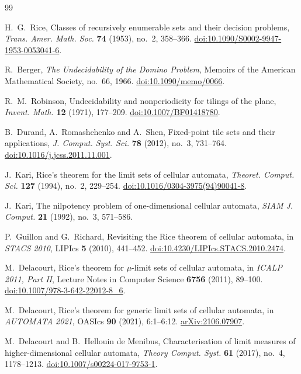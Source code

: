 \begin{thebibliography}{99}
\raggedright

H.~G.~Rice,
Classes of recursively enumerable sets and their decision problems,
\emph{Trans. Amer. Math. Soc.} \textbf{74} (1953), no.~2, 358--366.
\href{https://doi.org/10.1090/S0002-9947-1953-0053041-6}{doi:10.1090/S0002-9947-1953-0053041-6}.

R.~Berger,
\emph{The Undecidability of the Domino Problem},
Memoirs of the American Mathematical Society, no.~66, 1966.
\href{https://doi.org/10.1090/memo/0066}{doi:10.1090/memo/0066}.

R.~M.~Robinson,
Undecidability and nonperiodicity for tilings of the plane,
\emph{Invent. Math.} \textbf{12} (1971), 177--209.
\href{https://doi.org/10.1007/BF01418780}{doi:10.1007/BF01418780}.

B.~Durand, A.~Romashchenko and A.~Shen,
Fixed-point tile sets and their applications,
\emph{J. Comput. Syst. Sci.} \textbf{78} (2012), no.~3, 731--764.
\href{https://doi.org/10.1016/j.jcss.2011.11.001}{doi:10.1016/j.jcss.2011.11.001}.

J.~Kari,
Rice's theorem for the limit sets of cellular automata,
\emph{Theoret. Comput. Sci.} \textbf{127} (1994), no.~2, 229--254.
\href{https://doi.org/10.1016/0304-3975(94)90041-8}{doi:10.1016/0304-3975(94)90041-8}.

J.~Kari,
The nilpotency problem of one-dimensional cellular automata,
\emph{SIAM J. Comput.} \textbf{21} (1992), no.~3, 571--586.

P.~Guillon and G.~Richard,
Revisiting the Rice theorem of cellular automata,
in \emph{STACS 2010}, LIPIcs \textbf{5} (2010), 441--452.
\href{https://doi.org/10.4230/LIPIcs.STACS.2010.2474}{doi:10.4230/LIPIcs.STACS.2010.2474}.

M.~Delacourt,
Rice's theorem for $\mu$-limit sets of cellular automata,
in \emph{ICALP 2011, Part II}, Lecture Notes in Computer Science
\textbf{6756} (2011), 89--100.
\href{https://doi.org/10.1007/978-3-642-22012-8_6}{doi:10.1007/978-3-642-22012-8\_6}.

M.~Delacourt,
Rice's theorem for generic limit sets of cellular automata,
in \emph{AUTOMATA 2021}, OASIcs \textbf{90} (2021), 6:1--6:12.
\href{https://arxiv.org/abs/2106.07907}{arXiv:2106.07907}.

M.~Delacourt and B.~Hellouin de Menibus,
Characterisation of limit measures of higher-dimensional cellular automata,
\emph{Theory Comput. Syst.} \textbf{61} (2017), no.~4, 1178--1213.
\href{https://doi.org/10.1007/s00224-017-9753-1}{doi:10.1007/s00224-017-9753-1}.


\end{thebibliography}

